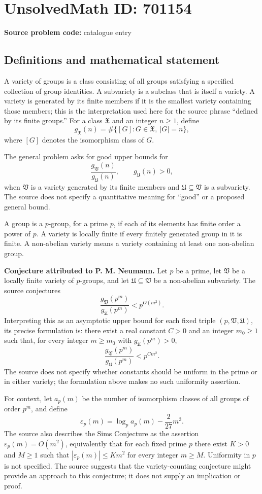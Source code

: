 \documentclass[11pt]{article}
\begin{document}
\section*{UnsolvedMath ID: 701154}
\textbf{Source problem code:} catalogue entry
\subsection{Definitions and mathematical statement}
A variety of groups is a class consisting of all groups satisfying a specified collection of group identities. A subvariety is a subclass that is itself a variety. A variety is generated by its finite members if it is the smallest variety containing those members; this is the interpretation used here for the source phrase ``defined by its finite groups.'' For a class \(\mathfrak{X}\) and an integer \(n\geq 1\), define
\[
g_{\mathfrak{X}}(n)=\#\{[G]:G\in\mathfrak{X},\ |G|=n\},
\]
where \([G]\) denotes the isomorphism class of \(G\).

The general problem asks for good upper bounds for
\[
\frac{g_{\mathfrak{V}}(n)}{g_{\mathfrak{U}}(n)},
\qquad g_{\mathfrak{U}}(n)>0,
\]
when \(\mathfrak{V}\) is a variety generated by its finite members and \(\mathfrak{U}\subseteq\mathfrak{V}\) is a subvariety. The source does not specify a quantitative meaning for ``good'' or a proposed general bound.

A group is a \(p\)-group, for a prime \(p\), if each of its elements has finite order a power of \(p\). A variety is locally finite if every finitely generated group in it is finite. A non-abelian variety means a variety containing at least one non-abelian group.

\textbf{Conjecture attributed to P. M. Neumann.} Let \(p\) be a prime, let \(\mathfrak{V}\) be a locally finite variety of \(p\)-groups, and let \(\mathfrak{U}\subseteq\mathfrak{V}\) be a non-abelian subvariety. The source conjectures
\[
\frac{g_{\mathfrak{V}}(p^m)}{g_{\mathfrak{U}}(p^m)}<p^{O(m^2)}.
\]
Interpreting this as an asymptotic upper bound for each fixed triple \((p,\mathfrak{V},\mathfrak{U})\), its precise formulation is: there exist a real constant \(C>0\) and an integer \(m_0\geq 1\) such that, for every integer \(m\geq m_0\) with \(g_{\mathfrak{U}}(p^m)>0\),
\[
\frac{g_{\mathfrak{V}}(p^m)}{g_{\mathfrak{U}}(p^m)}<p^{Cm^2}.
\]
The source does not specify whether constants should be uniform in the prime or in either variety; the formulation above makes no such uniformity assertion.

For context, let \(a_p(m)\) be the number of isomorphism classes of all groups of order \(p^m\), and define
\[
\varepsilon_p(m)=\log_p a_p(m)-\frac{2}{27}m^3.
\]
The source also describes the Sims Conjecture as the assertion \(\varepsilon_p(m)=O(m^2)\), equivalently that for each fixed prime \(p\) there exist \(K>0\) and \(M\geq1\) such that \(|\varepsilon_p(m)|\leq Km^2\) for every integer \(m\geq M\). Uniformity in \(p\) is not specified. The source suggests that the variety-counting conjecture might provide an approach to this conjecture; it does not supply an implication or proof.
\end{document}

